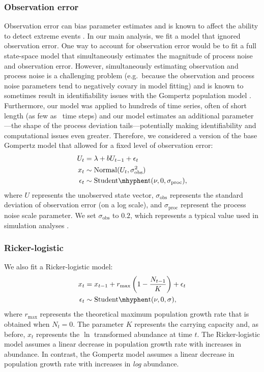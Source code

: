 \subsubsection{Observation error} Observation error can bias parameter
estimates \citep{knape2012} and is known to affect the ability to detect extreme
events \citep{ward2007}. In our main analysis, we fit a model that ignored
observation error. One way to account for observation error would be to fit a
full state-space model that simultaneously estimates the magnitude of process
noise and observation error. However, simultaneously estimating observation and
process noise is a challenging problem (e.g.\ because the observation and
process noise parameters tend to negatively covary in model fitting) and is
known to sometimes result in identifiability issues with the Gompertz
population model \citep{knape2008}. Furthermore, our model was applied to
hundreds of time series, often of short length (as few as \minTimeSteps\ time
steps) and our model estimates an additional parameter---the shape of the
process deviation tails---potentially making identifiability and computational
issues even greater. Therefore, we considered a version of the base Gompertz
model that allowed for a fixed level of observation error:
\begin{align}
U_t &= \lambda + b U_{t-1} + \epsilon_t\\
x_t &\sim \mathrm{Normal}(U_t, \sigma_\mathrm{obs}^2)\\
\epsilon_t &\sim \mathrm{Student\mhyphen t}(\nu, 0, \sigma_\mathrm{proc}),
\end{align}
where \(U\) represents the unobserved state vector, \(\sigma_\mathrm{obs}\)
represents the standard deviation of observation error (on a log scale), and
\(\sigma_\mathrm{proc}\) represent the process noise scale parameter. We set
\(\sigma_\mathrm{obs}\) to \(0.2\), which represents a typical value used in
simulation analyses \citep{valpine2002, thorson2014b}.

\subsubsection{Ricker-logistic} We also fit a Ricker-logistic model:
\begin{align}
x_t &= x_{t-1} + r_{\mathrm{max}}\left(1 - \frac{N_{t-1}}{K}\right) + \epsilon_t\\
\epsilon_t &\sim \mathrm{Student\mhyphen t}(\nu, 0, \sigma),
\end{align}
where \(r_\mathrm{max}\) represents the theoretical maximum population growth
rate that is obtained when \(N_t = 0\). The parameter \(K\) represents the
carrying capacity and, as before, \(x_t\) represents the \(\ln\) transformed
abundance at time \(t\). The Ricker-logistic model assumes a linear decrease in
population growth rate with increases in abundance. In contrast, the Gompertz
model assumes a linear decrease in population growth rate with increases in
\textit{log} abundance.

